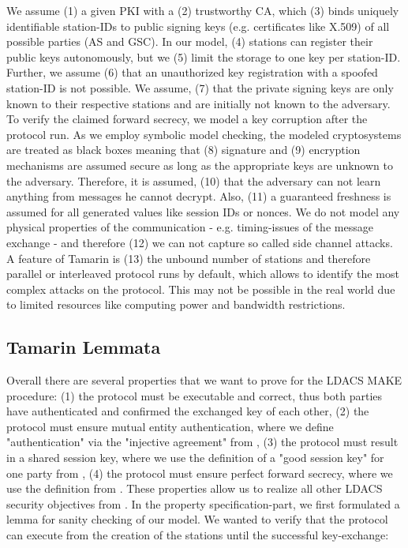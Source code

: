 We assume (1) a given \ac{PKI} with a (2) trustworthy CA, which (3) binds uniquely identifiable station-IDs to public signing keys (e.g. certificates like X.509) of all possible parties (\ac{AS} and \ac{GSC}). In our model, (4) stations can register their public keys autonomously, but we (5) limit the storage to one key per station-ID. Further, we assume (6) that an unauthorized key registration with a spoofed station-ID is not possible. We assume, (7) that the private signing keys are only known to their respective stations and are initially not known to the adversary. To verify the claimed forward secrecy, we model a key corruption after the protocol run.
As we employ symbolic model checking, the modeled cryptosystems are treated as black boxes meaning that (8) signature and (9) encryption mechanisms are assumed secure as long as the appropriate keys are unknown to the adversary. Therefore, it is assumed, (10) that the adversary can not learn anything from messages he cannot decrypt. Also, (11) a guaranteed freshness is assumed for all generated values like session IDs or nonces.
We do not model any physical properties of the communication - e.g. timing-issues of the message exchange - and therefore (12) we can not capture so called side channel attacks. 
A feature of Tamarin is (13) the unbound number of stations and therefore parallel or interleaved protocol runs by default, which allows to identify the most complex attacks on the protocol. This may not be possible in the real world due to limited resources like computing power and bandwidth restrictions.

\subsection{Tamarin Lemmata}
\label{subsec:lemmata}
Overall there are several properties that we want to prove for the LDACS MAKE procedure: (1) the protocol must be executable and correct, thus both parties have authenticated and confirmed the exchanged key of each other, (2) the protocol must ensure mutual entity authentication, where we define "authentication" via the "injective agreement" from \cite{lowe1997}, (3) the protocol must result in a shared session key, where we use the definition of a "good session key" for one party from \cite{syverson1994, boyd2020}, (4) the protocol must ensure perfect forward secrecy, where we use the definition from \cite{boyd2020}.
These properties allow us to realize all other LDACS security objectives from \cite{icao2018}. 
\vspace{0.5em}
In the property specification-part, we first formulated a lemma for sanity checking of our model. We wanted to verify that the protocol can execute from the creation of the stations until the successful key-exchange:

